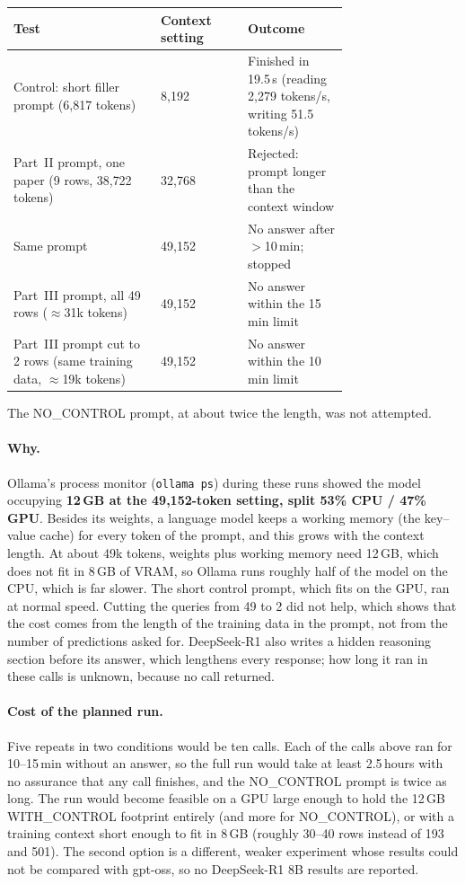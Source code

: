 \documentclass[11pt]{article}
\begin{document}
\begin{center}\small
\begin{tabular}{p{0.44\linewidth}lp{0.30\linewidth}}
\toprule
Test & Context setting & Outcome \\
\midrule
Control: short filler prompt (6{,}817 tokens) & 8{,}192 & Finished in 19.5\,s (reading
  2{,}279 tokens/s, writing 51.5 tokens/s) \\
Part~II prompt, one paper (9 rows, 38{,}722 tokens) & 32{,}768 & Rejected: prompt longer
  than the context window \\
Same prompt & 49{,}152 & No answer after $>$10\,min; stopped \\
Part~III prompt, all 49 rows ($\approx$31k tokens) & 49{,}152 & No answer within the
  15\,min limit \\
Part~III prompt cut to 2 rows (same training data, $\approx$19k tokens) & 49{,}152 &
  No answer within the 10\,min limit \\
\bottomrule
\end{tabular}
\end{center}

\noindent The NO\_CONTROL prompt, at about twice the length, was not attempted.

\paragraph{Why.} Ollama's process monitor (\texttt{ollama ps}) during these runs showed
the model occupying \textbf{12\,GB at the 49{,}152-token setting, split 53\% CPU / 47\%
GPU}. Besides its weights, a language model keeps a working memory (the key--value
cache) for every token of the prompt, and this grows with the context length. At
about 49k tokens, weights plus working memory need 12\,GB, which does not fit in 8\,GB of
VRAM, so Ollama runs roughly half of the model on the CPU, which is far slower. The
short control prompt, which fits on the GPU, ran at normal speed. Cutting the queries
from 49 to 2 did not help, which shows that the cost comes from the length of the
training data in the prompt, not from the number of predictions asked for. DeepSeek-R1
also writes a hidden reasoning section before its answer, which lengthens every
response; how long it ran in these calls is unknown, because no call returned.

\paragraph{Cost of the planned run.} Five repeats in two conditions would be ten calls.
Each of the calls above ran for 10--15\,min without an answer, so the full run would take
at least 2.5\,hours with no assurance that any call finishes, and the NO\_CONTROL prompt
is twice as long. The run would become feasible on a GPU large enough to hold the
12\,GB WITH\_CONTROL footprint entirely (and more for NO\_CONTROL), or with a training
context short enough to fit in 8\,GB (roughly 30--40 rows instead of 193 and 501). The
second option is a different, weaker experiment whose results could not be compared
with gpt-oss, so no DeepSeek-R1 8B results are reported.
\end{document}
